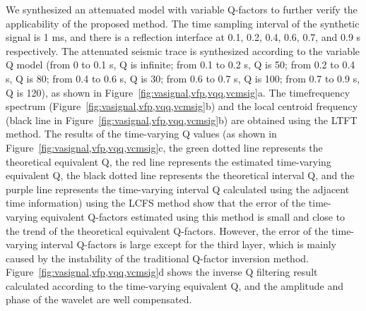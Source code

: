 We synthesized an attenuated model with variable Q-factors to further verify
the applicability of the proposed method. The time sampling interval of the
synthetic signal is 1 ms, and there is a reflection interface at 0.1, 0.2,
0.4, 0.6, 0.7, and 0.9 s respectively. The attenuated seismic trace is
synthesized according to the variable Q model (from 0 to 0.1 s, Q is
infinite; from 0.1 to 0.2 s, Q is 50; from 0.2 to 0.4 s, Q is 80; from 0.4 to
0.6 s, Q is 30; from 0.6 to 0.7 s, Q is 100; from 0.7 to 0.9 s, Q is 120), as
shown in Figure~\ref{fig:vasignal,vfp,vqq,vcmsig}a. The timefrequency
spectrum (Figure~\ref{fig:vasignal,vfp,vqq,vcmsig}b) and the local centroid
frequency (black line in Figure~\ref{fig:vasignal,vfp,vqq,vcmsig}b) are
obtained using the LTFT method. The results of the time-varying Q values (as
shown in Figure~\ref{fig:vasignal,vfp,vqq,vcmsig}c, the green dotted line
represents the theoretical equivalent Q, the red line represents the
estimated time-varying equivalent Q, the black dotted line represents the
theoretical interval Q, and the purple line represents the time-varying
interval Q calculated using the adjacent time information) using the LCFS
method show that the error of the time-varying equivalent Q-factors estimated
using this method is small and close to the trend of the theoretical
equivalent Q-factors. However, the error of the time-varying interval
Q-factors is large except for the third layer, which is mainly caused by the
instability of the traditional Q-factor inversion method.
Figure~\ref{fig:vasignal,vfp,vqq,vcmsig}d shows the inverse Q
filtering result calculated according to the time-varying equivalent Q, and
the amplitude and phase of the wavelet are well compensated.

